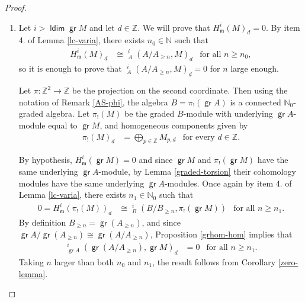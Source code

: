 \documentclass[11pt,fleqn]{article}
\theoremstyle{plain}
\theoremstyle{remark}
\theoremstyle{definition}
\newcommand\NN{\mathbb N}
\newcommand\ZZ{\mathbb Z}
\renewcommand\to{\longrightarrow}
\newcommand\m{\mathfrak m}
\DeclareMathOperator\GrExt{\underline{\mathsf{Ext}}}
\DeclareMathOperator\gr{\mathsf{gr}}
\DeclareMathOperator\ldim{\mathsf{ldim}}
\begin{document}
\begin{proof}
\begin{enumerate}
	\item Let $i > \ldim \gr M$ and let $d \in \ZZ$. We will prove that $H_\m^i(M)_d =
	0$. By item 4. of Lemma \ref{lc-varia}, there exists $n_0 \in \NN$ such that 
	\begin{align*}
	  H_\m^i(M)_d &\cong \GrExt^i_A(A/A_{\geq n}, M)_d &\mbox{for all } n \geq n_0,
	\end{align*}
	so it is enough to prove that $\GrExt^i_A(A/A_{\geq n},M)_d = 0$ for $n$ large
	enough. 
	
	Let $\pi: \ZZ^2 \to \ZZ$ be the projection on the second coordinate. Then using
	the notation of Remark \ref{AS-phi}, the algebra $B= \pi_!(\gr A)$ is a connected
	$\NN_0$-graded algebra. Let $\pi_!(M)$ be the graded $B$-module with
	underlying $\gr A$-module equal to $\gr M$, and homogeneous components given by
	\begin{align*}
	  \pi_!(M)_d &= \bigoplus_{p \in \ZZ} M_{p,d} & \mbox{for every } d \in \ZZ.
	\end{align*}

	By hypothesis, $H^i_\m(\gr M) = 0$ and since $\gr M$ and $\pi_!(\gr M)$ have the
	same underlying $\gr A$-module, by Lemma \ref{graded-torsion} their cohomology
	modules have the same underlying $\gr A$-modules. Once again by item 4. of Lemma
	\ref{lc-varia}, there exists $n_1 \in \NN_0$ such that
	\begin{align*}
	  0 = H^i_\m(\pi_!(M))_d &\cong \GrExt_{B}^i(B/B_{\geq n}, \pi_!(\gr M)) &\mbox{for
	  all } n \geq n_1.
	\end{align*}
	By definition $B_{\geq n} = \gr (A_{\geq n})$, and since $\gr A / \gr (A_{\geq n})
	\cong \gr (A/A_{\geq n})$, Proposition \ref{grhom-hom} implies that
	\begin{align*}
	  \GrExt^i_{\gr A}(\gr(A/A_{\geq n}), \gr M)_d &= 0 &\mbox{for all } n \geq n_1.
	\end{align*}
	Taking $n$ larger than both $n_0$ and $n_1$, the result follows from Corollary
	\ref{zero-lemma}.
\end{enumerate}
\end{proof}
\end{document}
